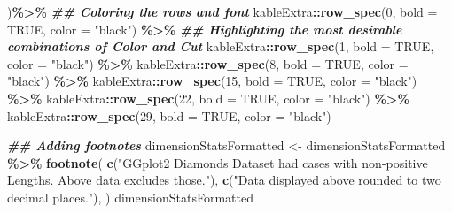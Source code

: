 \documentclass[
]{article}
\newenvironment{Shaded}{\begin{snugshade}}{\end{snugshade}}
\newcommand{\AttributeTok}[1]{\textcolor[rgb]{0.13,0.29,0.53}{#1}}
\newcommand{\ConstantTok}[1]{\textcolor[rgb]{0.56,0.35,0.01}{#1}}
\newcommand{\DecValTok}[1]{\textcolor[rgb]{0.00,0.00,0.81}{#1}}
\newcommand{\DocumentationTok}[1]{\textcolor[rgb]{0.56,0.35,0.01}{\textbf{\textit{#1}}}}
\newcommand{\FunctionTok}[1]{\textcolor[rgb]{0.13,0.29,0.53}{\textbf{#1}}}
\newcommand{\NormalTok}[1]{#1}
\newcommand{\OtherTok}[1]{\textcolor[rgb]{0.56,0.35,0.01}{#1}}
\newcommand{\SpecialCharTok}[1]{\textcolor[rgb]{0.81,0.36,0.00}{\textbf{#1}}}
\newcommand{\StringTok}[1]{\textcolor[rgb]{0.31,0.60,0.02}{#1}}
\begin{document}
\begin{Shaded}
\begin{Highlighting}[]
\NormalTok{  )}\SpecialCharTok{\%\textgreater{}\%} \DocumentationTok{\#\# Coloring the rows and font}
\NormalTok{  kableExtra}\SpecialCharTok{::}\FunctionTok{row\_spec}\NormalTok{(}\DecValTok{0}\NormalTok{, }\AttributeTok{bold =} \ConstantTok{TRUE}\NormalTok{, }\AttributeTok{color =} \StringTok{"black"}\NormalTok{) }\SpecialCharTok{\%\textgreater{}\%}
  \DocumentationTok{\#\# Highlighting the most desirable combinations of Color and Cut}
\NormalTok{  kableExtra}\SpecialCharTok{::}\FunctionTok{row\_spec}\NormalTok{(}\DecValTok{1}\NormalTok{, }\AttributeTok{bold =} \ConstantTok{TRUE}\NormalTok{, }\AttributeTok{color =} \StringTok{"black"}\NormalTok{) }\SpecialCharTok{\%\textgreater{}\%}
\NormalTok{  kableExtra}\SpecialCharTok{::}\FunctionTok{row\_spec}\NormalTok{(}\DecValTok{8}\NormalTok{, }\AttributeTok{bold =} \ConstantTok{TRUE}\NormalTok{, }\AttributeTok{color =} \StringTok{"black"}\NormalTok{) }\SpecialCharTok{\%\textgreater{}\%}
\NormalTok{  kableExtra}\SpecialCharTok{::}\FunctionTok{row\_spec}\NormalTok{(}\DecValTok{15}\NormalTok{, }\AttributeTok{bold =} \ConstantTok{TRUE}\NormalTok{, }\AttributeTok{color =} \StringTok{"black"}\NormalTok{) }\SpecialCharTok{\%\textgreater{}\%}
\NormalTok{  kableExtra}\SpecialCharTok{::}\FunctionTok{row\_spec}\NormalTok{(}\DecValTok{22}\NormalTok{, }\AttributeTok{bold =} \ConstantTok{TRUE}\NormalTok{, }\AttributeTok{color =} \StringTok{"black"}\NormalTok{) }\SpecialCharTok{\%\textgreater{}\%}
\NormalTok{  kableExtra}\SpecialCharTok{::}\FunctionTok{row\_spec}\NormalTok{(}\DecValTok{29}\NormalTok{, }\AttributeTok{bold =} \ConstantTok{TRUE}\NormalTok{, }\AttributeTok{color =} \StringTok{"black"}\NormalTok{)}

  
\DocumentationTok{\#\# Adding footnotes}
\NormalTok{dimensionStatsFormatted }\OtherTok{\textless{}{-}}\NormalTok{ dimensionStatsFormatted }\SpecialCharTok{\%\textgreater{}\%}
  \FunctionTok{footnote}\NormalTok{(}
    \FunctionTok{c}\NormalTok{(}\StringTok{"GGplot2 Diamonds Dataset had cases with non{-}positive Lengths. Above data excludes those."}\NormalTok{),}
    \FunctionTok{c}\NormalTok{(}\StringTok{"Data displayed above rounded to two decimal places."}\NormalTok{),}
\NormalTok{  )}
\NormalTok{dimensionStatsFormatted}
\end{Highlighting}
\end{Shaded}
\end{document}

